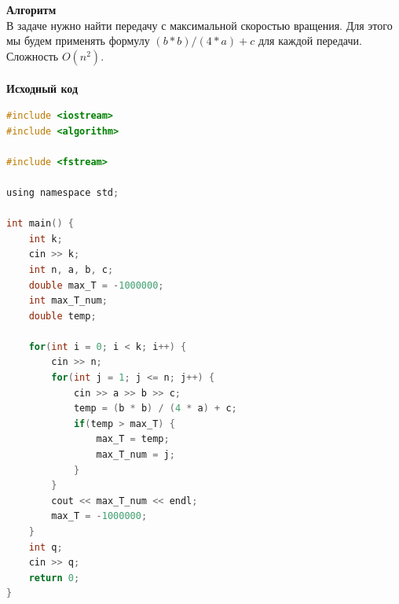 \documentclass[a4paper,12pt]{article}
\begin{document}
\textbf{{\large Алгоритм}} \\
В задаче нужно найти передачу с максимальной скоростью вращения. Для этого мы будем применять формулу $(b * b) / (4 * a) + c$ для каждой передачи. Сложность $O(n^2)$.\\ 
\\
\textbf{{\large Исходный код}}
\begin{lstlisting}[language=C]
#include <iostream>
#include <algorithm>

#include <fstream>

using namespace std;

int main() {
    int k;
    cin >> k;
    int n, a, b, c;
    double max_T = -1000000;
    int max_T_num;
    double temp;

    for(int i = 0; i < k; i++) {
        cin >> n;
        for(int j = 1; j <= n; j++) {
            cin >> a >> b >> c;
            temp = (b * b) / (4 * a) + c;
            if(temp > max_T) {
                max_T = temp;
                max_T_num = j;
            }
        }
        cout << max_T_num << endl;
        max_T = -1000000;
    }
	int q;
	cin >> q;
    return 0;
}
\end{lstlisting}
\end{document}

